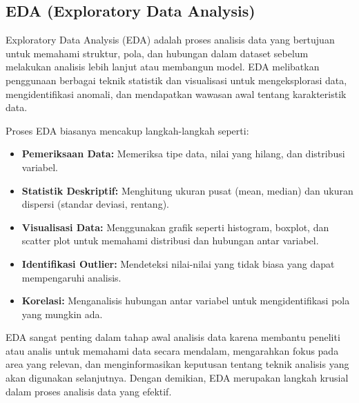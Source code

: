 \subsection{EDA (Exploratory Data Analysis)}
Exploratory Data Analysis (EDA) adalah proses analisis data yang bertujuan untuk memahami struktur, pola, dan hubungan dalam dataset sebelum melakukan analisis lebih lanjut atau membangun model. EDA melibatkan penggunaan berbagai teknik statistik dan visualisasi untuk mengeksplorasi data, mengidentifikasi anomali, dan mendapatkan wawasan awal tentang karakteristik data.

Proses EDA biasanya mencakup langkah-langkah seperti:
\begin{itemize}
    \item \textbf{Pemeriksaan Data:} Memeriksa tipe data, nilai yang hilang, dan distribusi variabel.
    \item \textbf{Statistik Deskriptif:} Menghitung ukuran pusat (mean, median) dan ukuran dispersi (standar deviasi, rentang).
    \item \textbf{Visualisasi Data:} Menggunakan grafik seperti histogram, boxplot, dan scatter plot untuk memahami distribusi dan hubungan antar variabel.
    \item \textbf{Identifikasi Outlier:} Mendeteksi nilai-nilai yang tidak biasa yang dapat mempengaruhi analisis.
    \item \textbf{Korelasi:} Menganalisis hubungan antar variabel untuk mengidentifikasi pola yang mungkin ada.
\end{itemize}

EDA sangat penting dalam tahap awal analisis data karena membantu peneliti atau analis untuk memahami data secara mendalam, mengarahkan fokus pada area yang relevan, dan menginformasikan keputusan tentang teknik analisis yang akan digunakan selanjutnya. Dengan demikian, EDA merupakan langkah krusial dalam proses analisis data yang efektif.

